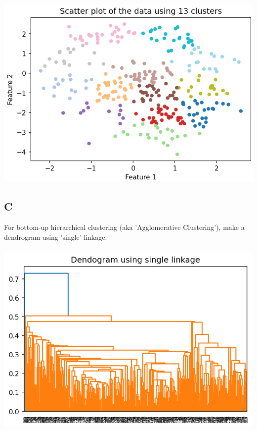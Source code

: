 \documentclass[12pt]{article}
\begin{document}
\includegraphics[width=1\textwidth]{p2.b.3.png}




\subsection{C}
For bottom-up hierarchical clustering (aka 'Agglomerative Clustering'), make a dendrogram using 'single' linkage.\\\\
\includegraphics[width=1\textwidth]{p2.c.png}
\end{document}
